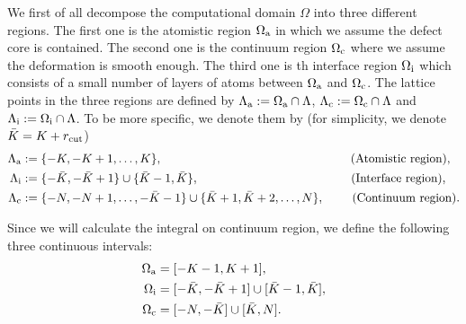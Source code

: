	We first of all decompose the computational domain $\Omega$ into three different regions. The first one is the atomistic region $\Omega_{{\rm a}}$ in which we assume the defect core is contained. The second one is the continuum region $\Omega_{{\rm c}}$ where we assume the deformation is smooth enough. The third one is th interface region $\Omega_{{\rm i}}$ which consists of a small number of layers of atoms between $\Omega_{{\rm a}}$ and $\Omega_{{\rm c}}$. The lattice points in the three regions are defined by $\Lambda_{\rm a}:= \Omega_{{\rm a}} \cap \Lambda$, $\Lambda_{\rm c}:= \Omega_{{\rm c}} \cap \Lambda$ and $\Lambda_{\rm i} := \Omega_{{\rm i}} \cap \Lambda$. To be more specific, we denote them by (for simplicity, we denote $\bar{K} = K+r_{{\rm cut}}$)
	\begin{align*}
		\Lambda_{\rm a} &:=\{-K,-K+1,\dots,K\}, \qquad \qquad \qquad \qquad \qquad \qquad \qquad \quad ~~  \text{(Atomistic region)},\\
		\Lambda_{\rm i} &:=\{-\bar{K},-\bar{K}+1\}\cup \{\bar{K}-1,\bar{K}\}, \qquad \qquad \qquad \qquad \qquad \qquad ~~ \text{(Interface region)},\\
		\Lambda_{\rm c} &:=\{-N,-N+1,\dots,-\bar{K}-1\}\cup\{\bar{K}+1,\bar{K}+2,\dots,N\}, \qquad ~ \text{(Continuum region)}.
	\end{align*}
	
	Since we will calculate the integral on continuum region, we define the following three continuous intervals:
	\begin{align*}
		\Omega_{{\rm a}} &=[-K-1,K+1],\\
		\Omega_{{\rm i}} &=[-\bar{K},-\bar{K}+1] \cup [\bar{K}-1,\bar{K}],\\
		\Omega_{{\rm c}}&=[-N,-\bar{K}]\cup [\bar{K},N].
	\end{align*}
	
	
